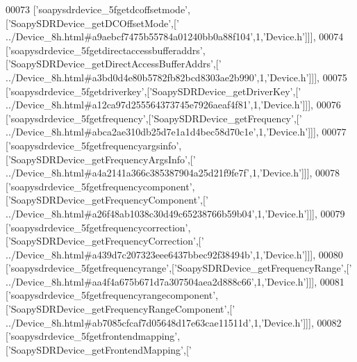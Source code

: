 \begin{DoxyCode}
00073   [\textcolor{stringliteral}{'soapysdrdevice\_5fgetdcoffsetmode'},[\textcolor{stringliteral}{'SoapySDRDevice\_getDCOffsetMode'},[\textcolor{stringliteral}{'
      ../Device\_8h.html#a9aebcf7475b55784a01240bb0a88f104'},1,\textcolor{stringliteral}{'Device.h'}]]],
00074   [\textcolor{stringliteral}{'soapysdrdevice\_5fgetdirectaccessbufferaddrs'},[\textcolor{stringliteral}{'SoapySDRDevice\_getDirectAccessBufferAddrs'},[\textcolor{stringliteral}{'
      ../Device\_8h.html#a3bd0d4e80b5782fb82bcd8303ae2b990'},1,\textcolor{stringliteral}{'Device.h'}]]],
00075   [\textcolor{stringliteral}{'soapysdrdevice\_5fgetdriverkey'},[\textcolor{stringliteral}{'SoapySDRDevice\_getDriverKey'},[\textcolor{stringliteral}{'
      ../Device\_8h.html#a12ca97d255564373745e7926aeaf4f81'},1,\textcolor{stringliteral}{'Device.h'}]]],
00076   [\textcolor{stringliteral}{'soapysdrdevice\_5fgetfrequency'},[\textcolor{stringliteral}{'SoapySDRDevice\_getFrequency'},[\textcolor{stringliteral}{'
      ../Device\_8h.html#abca2ae310db25d7e1a1d4bec58d70c1e'},1,\textcolor{stringliteral}{'Device.h'}]]],
00077   [\textcolor{stringliteral}{'soapysdrdevice\_5fgetfrequencyargsinfo'},[\textcolor{stringliteral}{'SoapySDRDevice\_getFrequencyArgsInfo'},[\textcolor{stringliteral}{'
      ../Device\_8h.html#a4a2141a366c385387904a25d21f9fe7f'},1,\textcolor{stringliteral}{'Device.h'}]]],
00078   [\textcolor{stringliteral}{'soapysdrdevice\_5fgetfrequencycomponent'},[\textcolor{stringliteral}{'SoapySDRDevice\_getFrequencyComponent'},[\textcolor{stringliteral}{'
      ../Device\_8h.html#a26f48ab1038c30d49c65238766b59b04'},1,\textcolor{stringliteral}{'Device.h'}]]],
00079   [\textcolor{stringliteral}{'soapysdrdevice\_5fgetfrequencycorrection'},[\textcolor{stringliteral}{'SoapySDRDevice\_getFrequencyCorrection'},[\textcolor{stringliteral}{'
      ../Device\_8h.html#a439d7c207323eee6437bbec92f38494b'},1,\textcolor{stringliteral}{'Device.h'}]]],
00080   [\textcolor{stringliteral}{'soapysdrdevice\_5fgetfrequencyrange'},[\textcolor{stringliteral}{'SoapySDRDevice\_getFrequencyRange'},[\textcolor{stringliteral}{'
      ../Device\_8h.html#aa4f4a675b671d7a307504aea2d888c66'},1,\textcolor{stringliteral}{'Device.h'}]]],
00081   [\textcolor{stringliteral}{'soapysdrdevice\_5fgetfrequencyrangecomponent'},[\textcolor{stringliteral}{'SoapySDRDevice\_getFrequencyRangeComponent'},[\textcolor{stringliteral}{'
      ../Device\_8h.html#ab7085cfcaf7d05648d17e63cae11511d'},1,\textcolor{stringliteral}{'Device.h'}]]],
00082   [\textcolor{stringliteral}{'soapysdrdevice\_5fgetfrontendmapping'},[\textcolor{stringliteral}{'SoapySDRDevice\_getFrontendMapping'},[\textcolor{stringliteral}{'
}
\end{DoxyCode}
